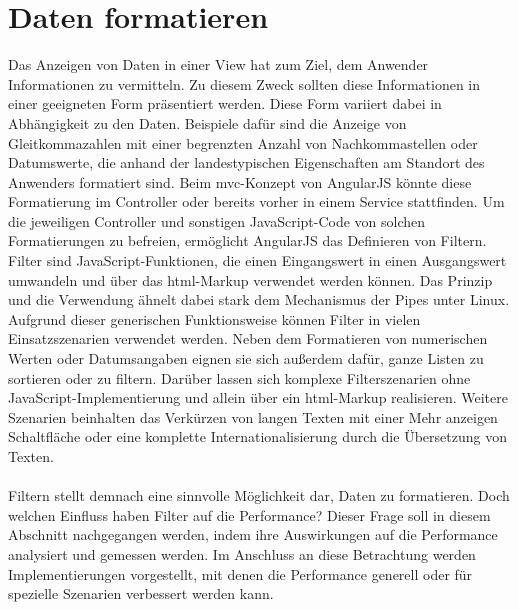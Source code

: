 \newpage
\section{Daten formatieren}
\label{formatdata-main}
Das Anzeigen von Daten in einer View hat zum Ziel, dem Anwender Informationen zu vermitteln. Zu diesem Zweck sollten diese Informationen in einer geeigneten Form präsentiert werden. Diese Form variiert dabei in Abhängigkeit zu den Daten. Beispiele dafür sind die Anzeige von Gleitkommazahlen mit einer begrenzten Anzahl von Nachkommastellen oder Datumswerte, die anhand der landestypischen Eigenschaften am Standort des Anwenders formatiert sind. Beim \gls{mvc}-Konzept von AngularJS könnte diese Formatierung im Controller oder bereits vorher in einem Service stattfinden. Um die jeweiligen Controller und sonstigen JavaScript-Code von solchen Formatierungen zu befreien, ermöglicht AngularJS das Definieren von Filtern. Filter sind JavaScript-Funktionen, die einen Eingangswert in einen Ausgangswert umwandeln und über das \gls{html}-Markup verwendet werden können. Das Prinzip und die Verwendung ähnelt dabei stark dem Mechanismus der \gls{Pipes} unter Linux. Aufgrund dieser generischen Funktionsweise können Filter in vielen Einsatzszenarien verwendet werden. Neben dem Formatieren von numerischen Werten oder Datumsangaben eignen sie sich außerdem dafür, ganze Listen zu sortieren oder zu filtern. Darüber lassen sich komplexe Filterszenarien ohne JavaScript-Implementierung und allein über ein \gls{html}-Markup realisieren. Weitere Szenarien beinhalten das Verkürzen von langen Texten mit einer \glqq Mehr anzeigen\grqq{} Schaltfläche oder eine komplette Internationalisierung durch die Übersetzung von Texten.\cite{AJSFilter}
\\\\
Filtern stellt demnach eine sinnvolle Möglichkeit dar, Daten zu formatieren. Doch welchen Einfluss haben Filter auf die Performance? Dieser Frage soll in diesem Abschnitt nachgegangen werden, indem ihre Auswirkungen auf die Performance analysiert und gemessen werden. Im Anschluss an diese Betrachtung werden Implementierungen vorgestellt, mit denen die Performance generell oder für spezielle Szenarien verbessert werden kann.
\\\\
